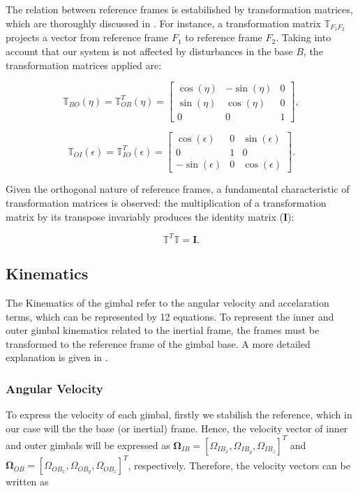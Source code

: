  The relation between reference frames is estabilished by transformation matrices, which are thoroughly discussed in . For instance, a transformation matrix $\mathbb{T}_{F_1 F_2}$ projects a vector from reference frame $F_1$ to reference frame $F_2$. Taking into account that our system is not affected by disturbances in the base $B$, the transformation matrices applied are:

 \begin{equation}
    \mathbb{T}_{BO}(\eta) = \mathbb{T}^T_{OB}(\eta) = \left[\begin{matrix} \cos(\eta) & -\sin(\eta) & 0 \\ \sin(\eta) & \cos(\eta) & 0 \\ 0 & 0 & 1 \end{matrix}\right],
 \end{equation}

  \begin{equation}
    \mathbb{T}_{OI}(\epsilon) = \mathbb{T}^T_{IO}(\epsilon) = \left[\begin{matrix} \cos(\epsilon) & 0 & \sin(\epsilon) \\ 0 & 1 & 0 \\ -\sin(\epsilon) & 0 & \cos(\epsilon) \end{matrix}\right].
 \end{equation}

 Given the orthogonal nature of reference frames, a fundamental characteristic of transformation matrices is observed: the multiplication of a transformation matrix by its transpose invariably produces the identity matrix ($\mathbf{I}$):

\begin{equation}
   \label{equacaoidentidade}
   \mathbb{T}^T\mathbb{T} = \mathbf{I}.
\end{equation}

 \subsection{Kinematics}
 The Kinematics of the gimbal refer to the angular velocity and accelaration terms, which can be represented by 12 equations. To represent the inner and outer gimbal kinematics related to the inertial frame, the frames must be transformed to the reference frame of the gimbal base. A more detailed explanation is given in .
 
 \subsubsection{Angular Velocity}
To express the velocity of each gimbal, firstly we stabilish the reference, which in our case will the the base (or inertial) frame. Hence, the velocity vector of inner and outer gimbals will be expressed as $\mathbf{\Omega}_{IB} = [\Omega_{IB_x},\Omega_{IB_y},\Omega_{IB_z}]^T$ and $\mathbf{\Omega}_{OB} = [\Omega_{OB_x},\Omega_{OB_y},\Omega_{OB_z}]^T$, respectively. Therefore, the velocity vectors can be written as

